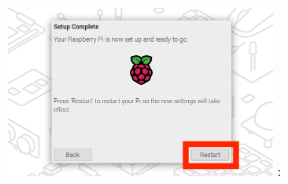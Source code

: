 \documentclass[a4paper,12pt]{jarticle}
\begin{document}
\begin{enumerate}
\begin{itemize}
\begin{figure}[h]
\begin{minipage}{5.228cm}
{                              \includegraphics[width=7.000cm]{sw_image08.png}
                              \newline
                              {\theFigure\label{seq:refFigure19}}:
                               }
                          \end{minipage}
                        \end{figure}
                  \end{itemize}  
                
\clearpage     
\end{enumerate}
\end{document}
